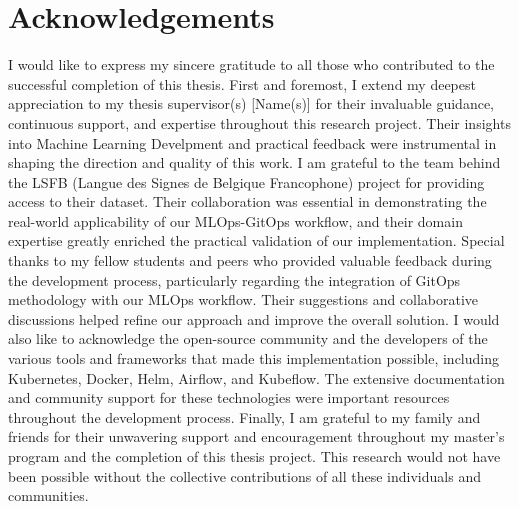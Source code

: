 \section{Acknowledgements}
I would like to express my sincere gratitude to all those who contributed to the successful completion of this thesis.
First and foremost, I extend my deepest appreciation to my thesis supervisor(s) [Name(s)] for their invaluable guidance, continuous support, and expertise throughout this research project.
Their insights into Machine Learning Develpment and practical feedback were instrumental in shaping the direction and quality of this work.
I am grateful to the team behind the LSFB (Langue des Signes de Belgique Francophone) project for providing access to their dataset.
Their collaboration was essential in demonstrating the real-world applicability of our MLOps-GitOps workflow, and their domain expertise greatly enriched the practical validation of our implementation.
Special thanks to my fellow students and peers who provided valuable feedback during the development process, particularly regarding the integration of GitOps methodology with our MLOps workflow.
Their suggestions and collaborative discussions helped refine our approach and improve the overall solution.
I would also like to acknowledge the open-source community and the developers of the various tools and frameworks that made this implementation possible, including Kubernetes, Docker, Helm, Airflow, and Kubeflow.
The extensive documentation and community support for these technologies were important resources throughout the development process.
Finally, I am grateful to my family and friends for their unwavering support and encouragement throughout my master's program and the completion of this thesis project.
This research would not have been possible without the collective contributions of all these individuals and communities.